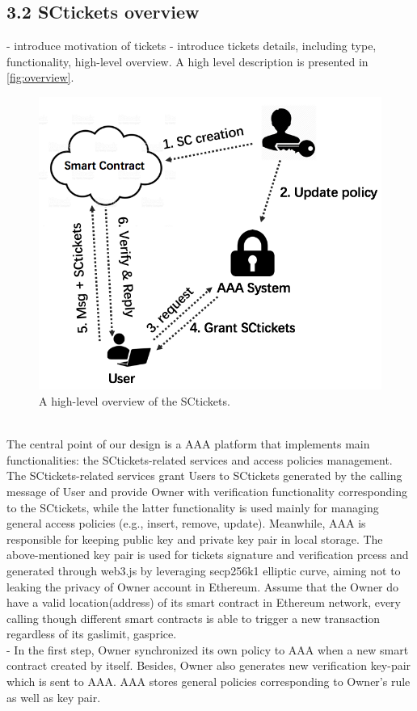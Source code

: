 \subsection*{3.2 SCtickets overview}
- introduce motivation of tickets
- introduce tickets details, including type, functionality, high-level overview.
\noindent A high level description is presented in \autoref{fig:overview}.
\begin{figure}[h!]
  \centering
  \includegraphics[width=0.7\linewidth]{fig/overview}
  \caption{A high-level overview of the SCtickets.}
  \label{fig:overview}
\end{figure}
\\\indent The central point of our design is a AAA platform that implements main functionalities: the SCtickets-related services and access policies management. The SCtickets-related services grant Users to SCtickets generated by the calling message of User and provide Owner with verification functionality corresponding to the SCtickets, while the latter functionality is used mainly for managing general access policies (e.g., insert, remove, update). Meanwhile, AAA is responsible for keeping public key and private key pair in local storage. The above-mentioned key pair is used for tickets signature and verification prcess and generated through web3.js by leveraging secp256k1 elliptic curve, aiming not to leaking the privacy of Owner account in Ethereum.
Assume that the Owner do have a valid location(address) of its smart contract in Ethereum network, every calling though different smart contracts is able to trigger a new transaction regardless of its gaslimit, gasprice.\\ - In the first step, Owner synchronized its own policy to AAA when a new smart contract created by itself. Besides, Owner also generates new verification key-pair which is sent to AAA. AAA stores general policies corresponding to Owner’s rule as well as key pair.
